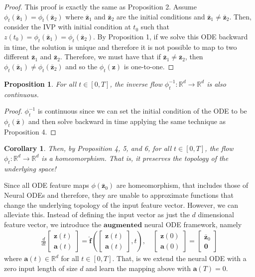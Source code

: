 \documentclass[12pt,letterpaper, onecolumn]{exam}
\newtheorem{proposition}[theorem]{Proposition}
\newtheorem{corollary}[theorem]{Corollary}
\theoremstyle{definition}
\begin{document}
\begin{proof}
    This proof is exactly the same as Proposition 2. Assume $\phi_t(\bar{\bm{z}}_1) = \phi_t(\bar{\bm{z}}_2)$ where $\bar{\bm{z}}_1$ and $\bar{\bm{z}}_2$ are the initial conditions and $\bar{\bm{z}}_1 \neq \bar{\bm{z}}_2$. Then, consider the IVP with initial condition at $t_0$ such that $z(t_0) = \phi_t(\bar{\bm{z}}_1) = \phi_t(\bar{\bm{z}}_2)$. By Proposition 1, if we solve this ODE backward in time, the solution is unique and therefore it is not possible to map to two different $\bar{\bm{z}}_1$ and $\bar{\bm{z}}_2$. Therefore, we must have that if $\bar{\bm{z}}_1 \neq \bar{\bm{z}}_2$, then $\phi_t(\bar{\bm{z}}_1) \neq \phi_t(\bar{\bm{z}}_2)$ and so the $\phi_t(\bm{z})$ is one-to-one.  
\end{proof}
\color{black}

\begin{proposition}
     For all $t \in [0, T]$, the inverse flow $\phi_t^{-1}:\mathbb{R}^d \to \mathbb{R}^d$ is also continuous. 
\end{proposition}

\begin{proof}
    $\phi_t^{-1}$ is continuous since we can set the initial condition of the ODE to be $\phi_t(\bar{\bm{z}})$ and then solve backward in time applying the same technique as Proposition 4. 
\end{proof}
\color{black}
\begin{corollary}
    Then, by Proposition 4, 5, and 6, for all $t \in [0, T]$, the flow $\phi_t: \mathbb{R}^d \to \mathbb{R}^d$ is a homeomorphism. That is, it preserves the topology of the underlying space!
\end{corollary}

Since all ODE feature maps $\phi(\bar{\bm{z}}_0)$ are homeomorphism, that includes those of Neural ODEs and therefore, they are unable to approximate functions that change the underlying topology of the input feature vector. However, we can alleviate this. Instead of defining the input vector as just the $d$ dimensional feature vector, we introduce the $\textbf{augmented}$ neural ODE framework, namely
\begin{align}
    \frac{d}{dt}\begin{bmatrix}
        \bm{z}(t) \\ \bm{a}(t) 
    \end{bmatrix} = \hat{\bm{f}}(\begin{bmatrix} \bm{z}(t) \\ \bm{a}(t) \end{bmatrix}, t ), \quad \begin{bmatrix} \bm{z}(0) \\ \bm{a}(0) \end{bmatrix} = \begin{bmatrix} \bar{\bm{z}}_0 \\ \bm{0} \end{bmatrix}
\end{align}
where $\bm{a}(t) \in \mathbb{R}^d$ for all $t \in [0, T]$. That, is we extend the neural ODE with a zero input length of size $d$ and learn the mapping above with $\bm{a}(T) = 0$. 
\end{document}
